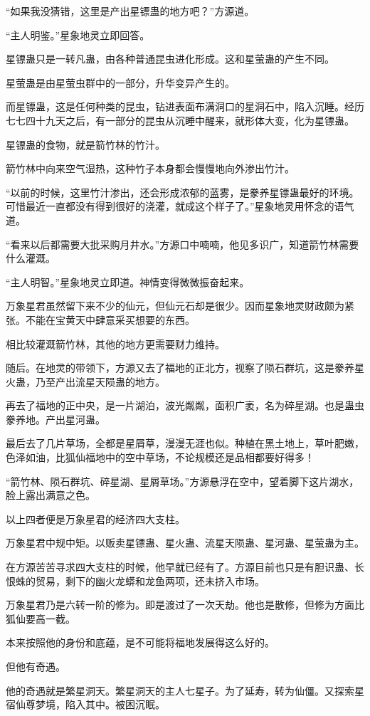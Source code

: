 \begin{this_body}
“如果我没猜错，这里是产出星镖蛊的地方吧？”方源道。

“主人明鉴。”星象地灵立即回答。

星镖蛊只是一转凡蛊，由各种普通昆虫进化形成。这和星萤蛊的产生不同。

星萤蛊是由星萤虫群中的一部分，升华变异产生的。

而星镖蛊，这是任何种类的昆虫，钻进表面布满洞口的星洞石中，陷入沉睡。经历七七四十九天之后，有一部分的昆虫从沉睡中醒来，就形体大变，化为星镖蛊。

星镖蛊的食物，就是箭竹林的竹汁。

箭竹林中向来空气湿热，这种竹子本身都会慢慢地向外渗出竹汁。

“以前的时候，这里竹汁渗出，还会形成浓郁的蓝雾，是豢养星镖蛊最好的环境。可惜最近一直都没有得到很好的浇灌，就成这个样子了。”星象地灵用怀念的语气道。

“看来以后都需要大批采购月井水。”方源口中喃喃，他见多识广，知道箭竹林需要什么灌溉。

“主人明智。”星象地灵立即道。神情变得微微振奋起来。

万象星君虽然留下来不少的仙元，但仙元石却是很少。因而星象地灵财政颇为紧张。不能在宝黄天中肆意采买想要的东西。

相比较灌溉箭竹林，其他的地方更需要财力维持。

随后。在地灵的带领下，方源又去了福地的正北方，视察了陨石群坑，这是豢养星火蛊，乃至产出流星天陨蛊的地方。

再去了福地的正中央，是一片湖泊，波光粼粼，面积广袤，名为碎星湖。也是蛊虫豢养地。产出星河蛊。

最后去了几片草场，全都是星屑草，漫漫无涯也似。种植在黑土地上，草叶肥嫩，色泽如油，比狐仙福地中的空中草场，不论规模还是品相都要好得多！

“箭竹林、陨石群坑、碎星湖、星屑草场。”方源悬浮在空中，望着脚下这片湖水，脸上露出满意之色。

以上四者便是万象星君的经济四大支柱。

万象星君中规中矩。以贩卖星镖蛊、星火蛊、流星天陨蛊、星河蛊、星萤蛊为主。

在方源苦苦寻求四大支柱的时候，他早就已经有了。方源目前也只是有胆识蛊、长恨蛛的贸易，剩下的幽火龙蟒和龙鱼两项，还未挤入市场。

万象星君乃是六转一阶的修为。即是渡过了一次天劫。他也是散修，但修为方面比狐仙要高一截。

本来按照他的身份和底蕴，是不可能将福地发展得这么好的。

但他有奇遇。

他的奇遇就是繁星洞天。繁星洞天的主人七星子。为了延寿，转为仙僵。又探索星宿仙尊梦境，陷入其中。被困沉眠。


\end{this_body}
